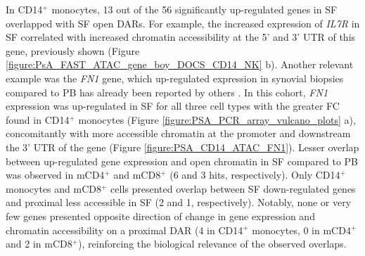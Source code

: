 In CD14$^+$ monocytes, 13 out of the 56 significantly up-regulated genes in SF overlapped with SF open DARs. For example, the increased expression of \textit{IL7R} in SF correlated with increased chromatin accessibility at the 5' and 3' UTR of this gene, previously shown (Figure \ref{figure:PsA_FAST_ATAC_gene_boy_DOCS_CD14_NK} b). Another relevant example was the \textit{FN1} gene, which up-regulated expression in synovial biopsies compared to PB has already been reported by others \parencite{Dolcino2015}. In this cohort, \textit{FN1} expression was up-regulated in SF for all three cell types with the greater FC found in CD14$^+$ monocytes (Figure \ref{figure:PSA_PCR_array_vulcano_plots} a), concomitantly with more accessible chromatin at the promoter and downstream the 3' UTR of the gene (Figure \ref{figure:PSA_CD14_ATAC_FN1}). Lesser overlap between up-regulated gene expression and open chromatin in SF compared to PB was observed in mCD4$^+$ and mCD8$^+$ (6 and 3 hits, respectively). Only CD14$^+$ monocytes and mCD8$^+$ cells presented overlap between SF down-regulated genes and proximal less accessible in SF (2 and 1, respectively). Notably, none or very few genes presented opposite direction of change in gene expression and chromatin accessibility on a proximal DAR (4 in CD14$^+$ monocytes, 0 in mCD4$^+$ and 2 in mCD8$^+$), reinforcing the biological relevance of the observed overlaps. 
	
